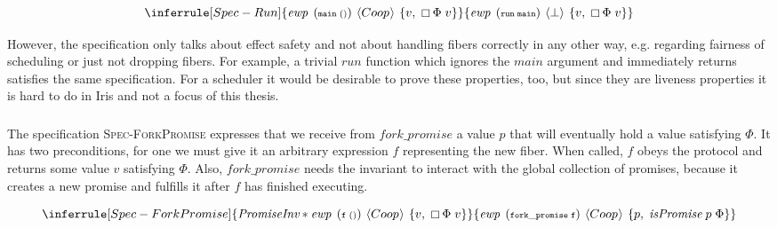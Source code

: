 \[
    \inferrule[Spec-Run]
    {\ewp{main\; ()}{\proto{}}{v,\; \always \Phi\; v}}
    {\ewp{run\; main}{\bot}{v,\; \always \Phi\; v}}
\]


However, the specification only talks about effect safety and not about handling fibers correctly in any other way, e.g. regarding fairness of scheduling or just not dropping fibers.
For example, a trivial \(run\) function which ignores the \(main\) argument and immediately returns satisfies the same specification.
For a scheduler it would be desirable to prove these properties, too, but since they are liveness properties it is hard to do in Iris and not a focus of this thesis.

\subsubsection{}
\label{sec:sched-spec-fork}

The specification \textsc{Spec-ForkPromise} expresses that we receive from \(fork\_promise\) a value \(p\) that will eventually hold a value satisfying \(\Phi\).
It has two preconditions, for one we must give it an arbitrary expression \(f\) representing the new fiber.
When called, \(f\) obeys the \proto{} protocol and returns some value \(v\) satisfying \(\Phi\).
Also, \(fork\_promise\) needs the \gsPInv{} invariant to interact with the global collection of promises, because it creates a new promise and fulfills it after \(f\) has finished executing.

\[
    \inferrule[Spec-ForkPromise]
    {\gsPInv{} \ast \ewp{f\;()}{\proto{}}{v,\; \always \Phi\; v}}
    {\ewp{fork\_promise\; f}{\proto{}}{p,\; \gsIsPr{}\; p\; \Phi}}
\]

